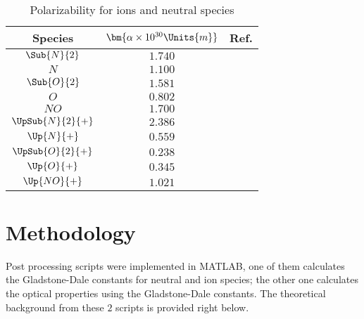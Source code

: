         \begin{table}[h]
        	\centering
            \begin{tabular}{| c | c | c |}
                \hline 
                \textbf{Species}  & $\bm{\alpha \times 10^{30}\Units{m}}$ & \textbf{Ref.}             \\
                \hline 
                $\Sub{N}{2}$      & $1.740$                               & \cite{lide:1997}          \\
                $N$               & $1.100$                               & \cite{lide:1997}          \\
                $\Sub{O}{2}$      & $1.581$                               & \cite{lide:1997}          \\
                $O$               & $0.802$                               & \cite{lide:1997}          \\
                $NO$              & $1.700$                               & \cite{lide:1997}          \\
                \hline 
                $\UpSub{N}{2}{+}$ & $2.386$                               & \cite{mccormack:pra:1991} \\
                $\Up{N}{+}$       & $0.559$                               & \cite{jacobson:pra:1996}  \\
                $\UpSub{O}{2}{+}$ & $0.238$                               & \cite{stewart:mp:1975}    \\
                $\Up{O}{+}$       & $0.345$                               & \cite{stewart:mp:1975}    \\
                $\Up{NO}{+}$      & $1.021$                               & \cite{feher:cpl:1993}     \\
                \hline 
            \end{tabular}
        \caption{Polarizability for ions and neutral species}
        \label{tab:polarizability}
        \end{table}



    \section{Methodology}
        \indent Post processing scripts were implemented in MATLAB, one of them calculates the Gladstone-Dale constants for neutral and ion species; the other one calculates the optical properties using the Gladstone-Dale constants. The theoretical background from these $2$ scripts is provided right below.  \\ 

